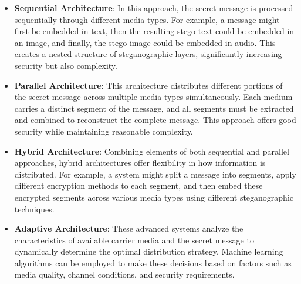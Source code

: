 \documentclass[12pt, a4paper, oneside]{book}
\begin{document}
\begin{itemize}[leftmargin=*]
    \item \textbf{Sequential Architecture}: In this approach, the secret message is processed sequentially through different media types. For example, a message might first be embedded in text, then the resulting stego-text could be embedded in an image, and finally, the stego-image could be embedded in audio. This creates a nested structure of steganographic layers, significantly increasing security but also complexity.

    \item \textbf{Parallel Architecture}: This architecture distributes different portions of the secret message across multiple media types simultaneously. Each medium carries a distinct segment of the message, and all segments must be extracted and combined to reconstruct the complete message. This approach offers good security while maintaining reasonable complexity.

    \item \textbf{Hybrid Architecture}: Combining elements of both sequential and parallel approaches, hybrid architectures offer flexibility in how information is distributed. For example, a system might split a message into segments, apply different encryption methods to each segment, and then embed these encrypted segments across various media types using different steganographic techniques.

    \item \textbf{Adaptive Architecture}: These advanced systems analyze the characteristics of available carrier media and the secret message to dynamically determine the optimal distribution strategy. Machine learning algorithms can be employed to make these decisions based on factors such as media quality, channel conditions, and security requirements.
\end{itemize}
\end{document}
